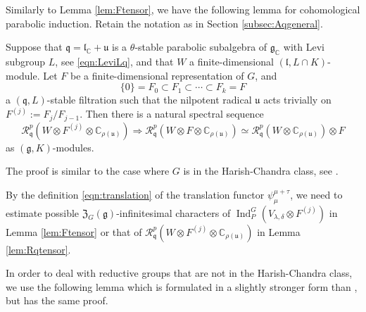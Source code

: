 Similarly to Lemma \ref{lem:Ftensor}, 
 we have the following lemma
 for cohomological parabolic induction.  
Retain the notation
 as in Section \ref{subsec:Aqgeneral}.  
\begin{lemma}
\label{lem:Rqtensor}
Suppose that ${\mathfrak{q}}={\mathfrak{l}}_{\mathbb{C}}+{\mathfrak{u}}$
 is a $\theta$-stable parabolic subalgebra
 of ${\mathfrak{g}}_{\mathbb{C}}$
 with Levi subgroup $L$, 
 see \eqref{eqn:LeviLq}, 
 and that $W$ a finite-dimensional $({\mathfrak{l}}, L \cap K)$-module.  
Let $F$ be a finite-dimensional representation of $G$, 
 and 
\[
  \{0\}= F_0 \subset F_1 \subset \cdots \subset F_k =F
\]
 a $({\mathfrak{q}},L)$-stable filtration 
 such that the nilpotent radical ${\mathfrak{u}}$
 acts trivially on $F^{(j)}:=F_j/F_{j-1}$.  
Then there is a natural spectral sequence
\[
  {\mathcal{R}}_{\mathfrak{q}}^p(W \otimes F^{(j)} \otimes {\mathbb{C}}_{\rho({\mathfrak{u}})})
  \Rightarrow
  {\mathcal{R}}_{\mathfrak{q}}^p(W \otimes F \otimes {\mathbb{C}}_{\rho({\mathfrak{u}})})
  \simeq 
  {\mathcal{R}}_{\mathfrak{q}}^p(W \otimes {\mathbb{C}}_{\rho({\mathfrak{u}})})
  \otimes F
\]
 as $({\mathfrak{g}},K)$-modules.  
\end{lemma}


The proof is similar to the case 
 where $G$ is in the Harish-Chandra class, 
 see \cite[Lem.~7.23]{Vogan81}.  

\vskip 1pc
By the definition \eqref{eqn:translation}
 of the translation functor $\psi_{\mu}^{\mu+\tau}$, 
 we need to estimate
 possible ${\mathfrak{Z}}_G({\mathfrak{g}})$-infinitesimal characters
 of $\operatorname{Ind}_P^G(V_{\lambda,\delta} \otimes F^{(j)})$
 in Lemma \ref{lem:Ftensor}
 or that of ${\mathcal{R}}_{\mathfrak{q}}^p(W \otimes F^{(j)} \otimes {\mathbb{C}}_{\rho({\mathfrak{u}})})$
 in Lemma \ref{lem:Rqtensor}.  



In order to deal with reductive groups
that are not in the Harish-Chandra class, 
 we use the following lemma 
 which is formulated in a slightly stronger form
 than \cite[Lem.~7.2.18]{Vogan81}, 
but has the same proof.  

